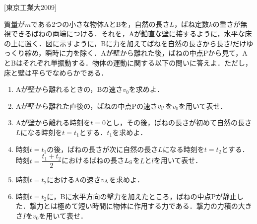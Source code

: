 

\noindent
{} [東京工業大2009]

質量が$m$である2つの小さな物体AとBを，自然の長さ$L$，ばね定数$k$の重さが無視できるばねの両端につける．それを，Aが鉛直な壁に接するように，水平な床の上に置く．図に示すように，Bに力を加えてばねを自然の長さから長さ$l$だけゆっくり縮め，瞬時に力を除く．Aが壁から離れた後，ばねの中点Pから見て，AとBはそれぞれ単振動する．物体の運動に関する以下の問いに答えよ．ただし，床と壁は平らでなめらかである．
\begin{enumerate}[(1)]
  \item {\hzw}Aが壁から離れるときの，Bの速さ$v_0$を求めよ．
  \item {\hzw}Aが壁から離れた直後の，ばねの中点Pの速さ$v_\mathrm{P}$を$v_0$を用いて表せ．
  \item {\hzw}Aが壁から離れる時刻を$t = 0$とし，その後，ばねの長さが初めて自然の長さ$L$になる時刻を$t = t_1$とする．$t_1$を求めよ．
  \item {\hzw}時刻$t = t_1$の後，ばねの長さが次に自然の長さ$L$になる時刻を$t = t_2$とする．時刻$t = \dfrac{t_1 + t_2}{2}$におけるばねの長さ$L_\mathrm{S}$を$L$と$l$を用いて表せ．
  \item {\hzw}時刻$t=t_2$におけるAの速さ$v_\mathrm{A}$を求めよ．
  \item {\hzw}時刻$t = t_2$に，Bに水平方向の撃力を加えたところ，ばねの中点Pが静止した．撃力とは極めて短い時間に物体に作用する力である．撃力の力積の大きさ$I$を$v_0$を用いて表せ．
\end{enumerate}
